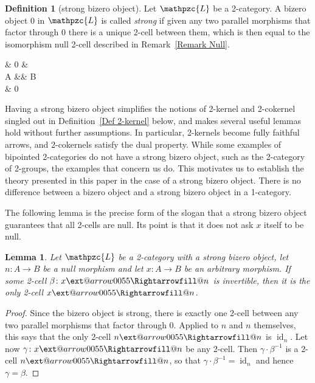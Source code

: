 \documentclass[reqno,a4paper]{amsart}
\makeatletter
\numberwithin{equation}{section}
\theoremstyle{plain}
\newtheorem{lemma}[subsection]{Lemma}
\theoremstyle{definition}
\newtheorem{definition}[subsection]{Definition}
\def\nameit#1{\textrm{#1}~}
\def\defx{\nameit{Definition}}
\def\remx{\nameit{Remark}}
\def\dfn#1{{\itshape #1}}
\newcommand{\catfont}[1]{\ensuremath{\mathpzc{#1}}\xspace}
\def\L{\catfont{L}}
\renewcommand{\1}{\onecat{1}}
\newcommand{\id}[1]{\operatorname{id}_{#1}}
\newcommand{\aR}[2][]{%
	\ext@arrow 0055{\Rightarrowfill@}{#1}{#2}}
\makeatother
\begin{document}
\begin{definition}[strong bizero object]\label{Def Strong}
	Let \(\L\) be a 2-category. A bizero object \(0\) in \(\L\) is called \dfn{strong} if given any two parallel morphisms that factor through \(0\) there is a unique 2-cell between them, which is then equal to the isomorphism null 2-cell described in \remx\ref{Remark Null}.
	\begin{cd}[0]
		\& 0 \& \\
		A \&\& B \\
		\& 0
		\arrow[bend left =12, from=1-2, to=2-3]
		\arrow["{\exists ! \theta}", Rightarrow, from=1-2, to=3-2]
		\arrow[bend left =12, from=2-1, to=1-2]
		\arrow[bend right =12, from=2-1, to=3-2]
		\arrow[bend right =12, from=3-2, to=2-3]
	\end{cd}
\end{definition}

Having a strong bizero object simplifies the notions of 2-kernel and 2-cokernel singled out in \defx\ref{Def 2-kernel} below, and makes several useful lemmas hold without further assumptions. In particular, 2-kernels become fully faithful arrows, and 2-cokernels satisfy the dual property. While some examples of bipointed 2-categories do not have a strong bizero object, such as the 2-category of 2-groups, the examples that concern us do. This motivates us to establish the theory presented in this paper in the case of a strong bizero object. There is no difference between a bizero object and a strong bizero object in a 1-category.

The following lemma is the precise form of the slogan that a strong bizero object guarantees that all 2-cells are null. Its point is that it does not ask \(x\) itself to be null.

\begin{lemma}\label{L:UniqueNull}
	Let \(\L\) be a 2-category with a strong bizero object, let \(n\colon A\to B\) be a null morphism and let \(x\colon A\to B\) be an arbitrary morphism. If some 2-cell \(\beta\colon x\aR{}n\) is invertible, then it is the only 2-cell \(x\aR{}n\).
\end{lemma}

\begin{proof}
	Since the bizero object is strong, there is exactly one 2-cell between any two parallel morphisms that factor through \(0\). Applied to \(n\) and \(n\) themselves, this says that the only 2-cell \(n\aR{}n\) is \(\id{n}\). Let now \(\gamma\colon x\aR{}n\) be any 2-cell. Then \(\gamma\cdot\beta^{-1}\) is a 2-cell \(n\aR{}n\), so that \(\gamma\cdot\beta^{-1}=\id{n}\) and hence \(\gamma=\beta\).
\end{proof}
\end{document}
